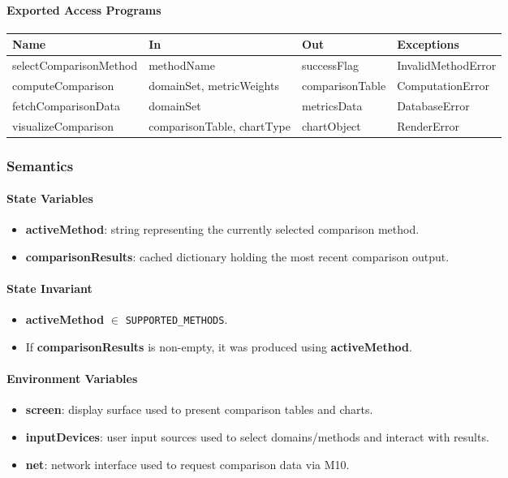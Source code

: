 \documentclass[12pt, titlepage]{article}
\begin{document}
\paragraph{Exported Access Programs}
\begin{center}
\renewcommand{\arraystretch}{1.2}
\begin{tabularx}{\textwidth}{l X X l}
\toprule
\textbf{Name} & \textbf{In} & \textbf{Out} & \textbf{Exceptions}\\
\midrule
selectComparisonMethod & methodName & successFlag & InvalidMethodError \\
computeComparison & domainSet, metricWeights & comparisonTable & ComputationError \\
fetchComparisonData & domainSet & metricsData & DatabaseError \\
visualizeComparison & comparisonTable, chartType & chartObject & RenderError \\
\bottomrule
\end{tabularx}
\end{center}

\subsubsection{Semantics}

\paragraph{State Variables}
\begin{itemize}
  \item \textbf{activeMethod}: string representing the currently selected comparison method.
  \item \textbf{comparisonResults}: cached dictionary holding the most recent comparison output.
\end{itemize}

\paragraph{State Invariant}
\begin{itemize}
  \item \textbf{activeMethod} $\in$ \texttt{SUPPORTED\_METHODS}.
  \item If \textbf{comparisonResults} is non-empty, it was produced using \textbf{activeMethod}.
\end{itemize}

\paragraph{Environment Variables}
\begin{itemize}
  \item \textbf{screen}: display surface used to present comparison tables and charts.
  \item \textbf{inputDevices}: user input sources used to select domains/methods and interact with results.
  \item \textbf{net}: network interface used to request comparison data via M10.
\end{itemize}
\end{document}
